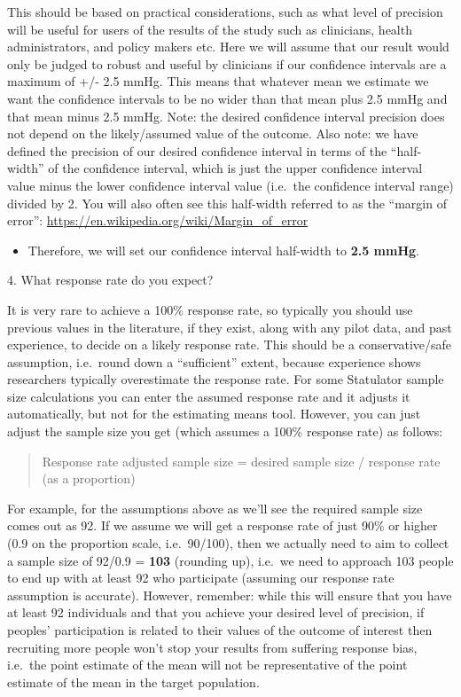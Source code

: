 \documentclass[
]{book}
\providecommand{\tightlist}{%
  \setlength{\itemsep}{0pt}\setlength{\parskip}{0pt}}
\begin{document}
This should be based on practical considerations, such as what level of precision will be useful for users of the results of the study such as clinicians, health administrators, and policy makers etc. Here we will assume that our result would only be judged to robust and useful by clinicians if our confidence intervals are a maximum of +/- 2.5 mmHg. This means that whatever mean we estimate we want the confidence intervals to be no wider than that mean plus 2.5 mmHg and that mean minus 2.5 mmHg. Note: the desired confidence interval precision does not depend on the likely/assumed value of the outcome. Also note: we have defined the precision of our desired confidence interval in terms of the ``half-width'' of the confidence interval, which is just the upper confidence interval value minus the lower confidence interval value (i.e.~the confidence interval range) divided by 2. You will also often see this half-width referred to as the ``margin of error'': \url{https://en.wikipedia.org/wiki/Margin_of_error}

\begin{itemize}
\tightlist
\item
  Therefore, we will set our confidence interval half-width to \textbf{2.5 mmHg}.
\end{itemize}

4. What response rate do you expect?

It is very rare to achieve a 100\% response rate, so typically you should use previous values in the literature, if they exist, along with any pilot data, and past experience, to decide on a likely response rate. This should be a conservative/safe assumption, i.e.~round down a ``sufficient'' extent, because experience shows researchers typically overestimate the response rate. For some Statulator sample size calculations you can enter the assumed response rate and it adjusts it automatically, but not for the estimating means tool. However, you can just adjust the sample size you get (which assumes a 100\% response rate) as follows:

\begin{quote}
Response rate adjusted sample size = desired sample size / response rate (as a proportion)
\end{quote}

For example, for the assumptions above as we'll see the required sample size comes out as 92. If we assume we will get a response rate of just 90\% or higher (0.9 on the proportion scale, i.e.~90/100), then we actually need to aim to collect a sample size of 92/0.9 = \textbf{103} (rounding up), i.e.~we need to approach 103 people to end up with at least 92 who participate (assuming our response rate assumption is accurate). However, remember: while this will ensure that you have at least 92 individuals and that you achieve your desired level of precision, if peoples' participation is related to their values of the outcome of interest then recruiting more people won't stop your results from suffering response bias, i.e.~the point estimate of the mean will not be representative of the point estimate of the mean in the target population.
\end{document}
